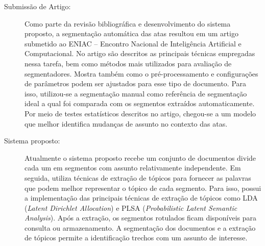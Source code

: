 \begin{description}
	
	\item[Submissão de Artigo:] Como parte da revisão bibliográfica e desenvolvimento do sistema proposto, a segmentação automática das atas resultou em um artigo submetido ao ENIAC -- Encontro Nacional de Inteligência Artificial e Computacional. 
%	
No artigo são descritos as principais técnicas empregadas nessa tarefa, bem como métodos mais utilizados para avaliação de segmentadores. Mostra também como o pré-processamento e configurações de parâmetros podem ser ajustados para esse tipo de documento. Para isso, utilizou-se a segmentação manual como referência de segmentação ideal a qual foi comparada com os segmentos extraídos automaticamente. Por meio de testes estatísticos descritos no artigo, chegou-se a um modelo que melhor identifica mudanças de assunto no contexto das atas.
	

	\item[Sistema proposto:] Atualmente o sistema proposto recebe um conjunto de documentos divide cada um em segmentos com assunto relativamente independente. Em seguida, utiliza técnicas de extração de tópicos para fornecer as palavras que podem melhor representar o tópico de cada segmento. Para isso, possui a implementação das principais técnicas de extração de tópicos como LDA (\textit{Latent Dirichlet Allocation}) e PLSA (\textit{Probabilistic Latent Semantic Analysis}). Após a extração, os segmentos rotulados ficam disponíveis para consulta ou armazenamento. A segmentação dos documentos e a extração de tópicos permite a identificação trechos com um assunto de interesse.
	
	
	
	
	
\end{description}
























